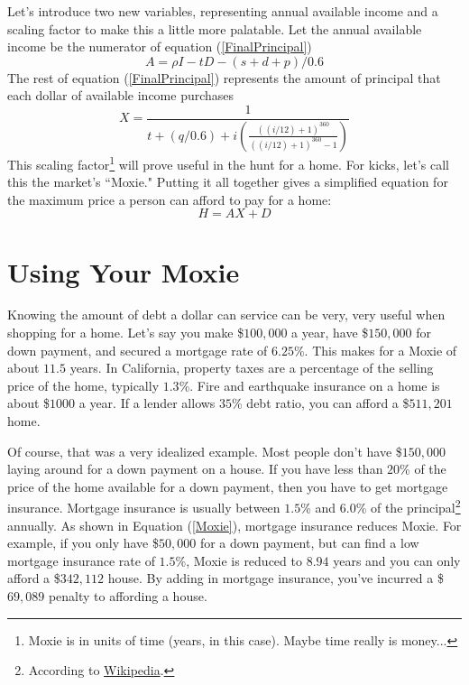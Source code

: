 \documentclass{article}
\begin{document}
Let's introduce two new variables, representing annual available income
 and a scaling factor to make this a little more palatable. Let the 
annual available income be the numerator of equation (\ref{FinalPrincipal})
\begin{equation}
\label{AvailableIncome}
A = \rho I - tD - (s + d + p) / 0.6
\end{equation}
The rest of equation (\ref{FinalPrincipal}) represents the amount of
 principal that each dollar of available income purchases 
\begin{equation}
\label{Moxie}
X = \frac{1}{t + (q/0.6) +
i \left( \frac{((i/12) + 1)^{360}}{((i/12) + 1)^{360} - 1} \right)}
\end{equation}
This scaling factor\footnote{ 
Moxie is in units of time (years, in this case). Maybe time really is
 money...}
will prove useful in the hunt for a home. For kicks, let's call this
 the market's ``Moxie." Putting it all together gives a simplified
 equation for the maximum price a person can afford to pay for a home:
\begin{equation}
\label{SimplifiedHomePrice}
H = AX + D
\end{equation}

\pagebreak


\section{Using Your Moxie}

Knowing the amount of debt a dollar can service can be very, 
very useful when 
shopping for a home.  Let's say you make \$$100,000$ a year, have
 \$$150,000$ for down payment, and secured a mortgage rate of 
$6.25$\%.  This makes for a Moxie of about $11.5$ years. 
In California, property taxes are a percentage of the
 selling price of the home, typically $1.3$\%.  Fire and earthquake
 insurance on a home is about \$$1000$ a year. If a lender allows
 $35$\% debt ratio, you can afford a \$$511,201$ home.

Of course, that was a very idealized example. Most people don't have 
\$$150,000$ laying around for a down payment on a house. If you have
less than $20$\% of the price of the home available for a down payment,
then you have to get mortgage insurance. Mortgage 
insurance is usually
between $1.5$\% and $6.0$\% of the 
principal\footnote{According to 
\href{http://en.wikipedia.org/wiki/Mortgage_insurance}{Wikipedia}.} 
 annually. As shown in Equation (\ref{Moxie}), mortgage insurance 
reduces Moxie. For example, if you only have \$$50,000$ for a down
payment, but can find a low mortgage insurance rate of $1.5$\%, Moxie
is reduced to $8.94$ years and you can only afford a \$$342,112$ house.
By adding in mortgage insurance, you've incurred a \$$69,089$ penalty
to affording a house.
\end{document}
